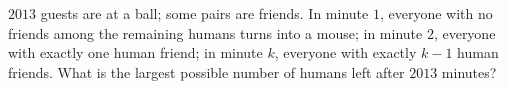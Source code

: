 $2013$ guests are at a ball; some pairs are friends. In minute $1$, everyone with no friends among the remaining humans turns into a mouse; in minute $2$, everyone with exactly one human friend; in minute $k$, everyone with exactly $k-1$ human friends. What is the largest possible number of humans left after $2013$ minutes?
